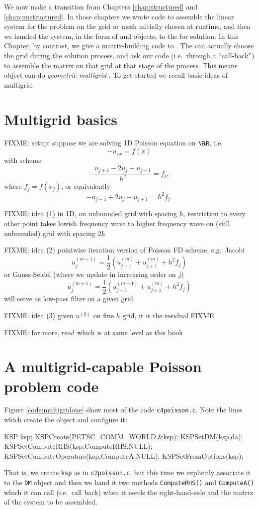 
We now make a transition from Chapters \ref{chap:structured} and \ref{chap:unstructured}.  In those chapters we wrote code to assemble the linear system for the problem on the grid or mesh initially chosen at runtime, and then we handed the system, in the form of \pMat and \pVec objects, to the \pKSP for solution.  In this Chapter, by contrast, we give a matrix-building code to \pKSP.  The \pKSP can actually choose the grid during the solution process, and ask our code (i.e.~through a ``call-back'') to assemble the matrix on that grid at that stage of the process.  This means \PETSc \pKSP object can do \emph{geometric multigrid} \citep{Briggsetal2000}.  To get started we recall basic ideas of multigrid.


\section{Multigrid basics}

FIXME: setup: suppose we are solving 1D Poisson equation on $\RR$, i.e.
    $$- u_{xx} = f(x)$$
with scheme
    $$- \frac{u_{j+1} - 2 u_j + u_{j-1}}{h^2} = f_j,$$
where $f_j = f(x_j)$, or equivalently
    $$- u_{j-1} + 2 u_j - u_{j+1} = h^2 f_j.$$

FIXME: idea (1) in 1D, on unbounded grid with spacing $h$, restriction to every other point takes lowish frequency wave to higher frequency wave on (still unbounded) grid with spacing $2h$

FIXME: idea (2) pointwise iteration version of Poisson FD scheme, e.g.~Jacobi
   $$u_j^{(m+1)} = \frac{1}{2} \left(u_{j-1}^{(m)} + u_{j+1}^{(m)} + h^2 f_j\right) $$
or Gauss-Seidel (where we update in increasing order on $j$)
   $$u_j^{(m+1)} = \frac{1}{2} \left(u_{j-1}^{(m+1)} + u_{j+1}^{(m)} + h^2 f_j\right) $$
will serve as low-pass filter on a given grid

FIXME: idea (3) given $u^{(0)}$ on fine $h$ grid, it is the residual FIXME

FIXME: for more, read \citep{Briggsetal2000} which is at same level as this book


\section{A multigrid-capable Poisson problem code}

Figure \ref{code:multigridone} show most of the code \texttt{c4poisson.c}.  Note the lines which create the \pKSP object and configure it:
\begin{code}
  KSP ksp;
  KSPCreate(PETSC_COMM_WORLD,&ksp);
  KSPSetDM(ksp,da);
  KSPSetComputeRHS(ksp,ComputeRHS,NULL);
  KSPSetComputeOperators(ksp,ComputeA,NULL);
  KSPSetFromOptions(ksp);
\end{code}
That is, we create \texttt{ksp} as in \texttt{c2poisson.c}, but this time we explicitly associate it to the \texttt{DM} object and then we hand it two methods \texttt{ComputeRHS()} and \texttt{ComputeA()} which it can call (i.e.~call back) when it needs the right-hand-side and the matrix of the system to be assembled.

